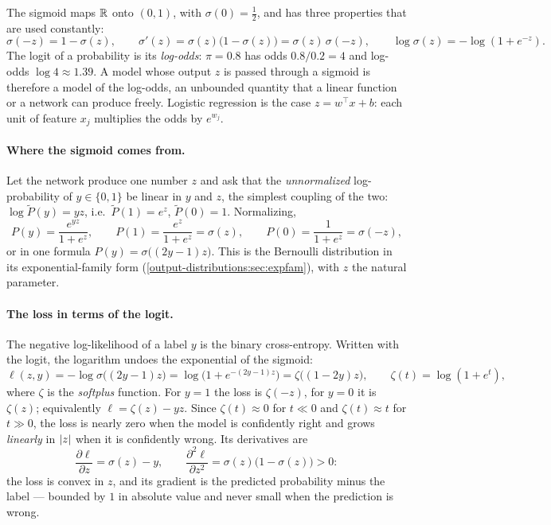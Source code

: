 \begin{notechapter}
The sigmoid maps $\mathbb{R}$ onto $(0,1)$, with $\sigma(0) = \frac12$, and has three properties that
are used constantly:
\[
  \sigma(-z) = 1 - \sigma(z),\qquad
  \sigma'(z) = \sigma(z)\bigl(1 - \sigma(z)\bigr) = \sigma(z)\,\sigma(-z),\qquad
  \log\sigma(z) = -\log(1 + e^{-z}).
\]
The logit of a probability is its \emph{log-odds}: $\pi = 0.8$ has odds $0.8/0.2 = 4$ and
log-odds $\log4\approx1.39$. A model whose output $z$ is passed through a sigmoid is
therefore a model of the log-odds, an unbounded quantity that a linear function
or a network can produce freely. Logistic regression is the case $z = w^\top x + b$: each
unit of feature $x_j$ multiplies the odds by $e^{w_j}$.

\paragraph{Where the sigmoid comes from.} Let the network produce one number $z$
and ask that the \emph{unnormalized} log-probability of $y\in\{0, 1\}$ be linear in $y$ and
$z$, the simplest coupling of the two: $\log\tilde P(y) = yz$, i.e.\ $\tilde P(1) = e^z$,
$\tilde P(0) = 1$. Normalizing,
\[
  P(y) = \frac{e^{yz}}{1 + e^z},\qquad P(1) = \frac{e^z}{1 + e^z} = \sigma(z),\qquad P(0) = \frac1{1 + e^z} = \sigma(-z),
\]
or in one formula $P(y) = \sigma\bigl((2y - 1)z\bigr)$. This is the Bernoulli distribution in its
exponential-family form (\cref{output-distributions:sec:expfam}), with $z$ the natural
parameter.

\paragraph{The loss in terms of the logit.} The negative log-likelihood of a label
$y$ is the binary cross-entropy. Written with the logit, the logarithm undoes
the exponential of the sigmoid:
\[
  \ell(z, y) = -\log\sigma\bigl((2y - 1)z\bigr) = \log\bigl(1 + e^{-(2y-1)z}\bigr) = \zeta\bigl((1 - 2y)z\bigr),
  \qquad \zeta(t) = \log(1 + e^t),
\]
where $\zeta$ is the \emph{softplus} function. For $y = 1$ the loss is $\zeta(-z)$, for $y = 0$ it is
$\zeta(z)$; equivalently $\ell = \zeta(z) - yz$. Since $\zeta(t)\approx0$ for $t\ll0$ and $\zeta(t)\approx t$ for
$t\gg0$, the loss is nearly zero when the model is confidently right and grows
\emph{linearly} in $\left|z\right|$ when it is confidently wrong. Its derivatives are
\[
  \frac{\partial\ell}{\partial z} = \sigma(z) - y,\qquad
  \frac{\partial^2\ell}{\partial z^2} = \sigma(z)\bigl(1 - \sigma(z)\bigr)>0:
\]
the loss is convex in $z$, and its gradient is the predicted probability minus
the label --- bounded by $1$ in absolute value and never small when the
prediction is wrong.


\end{notechapter}
